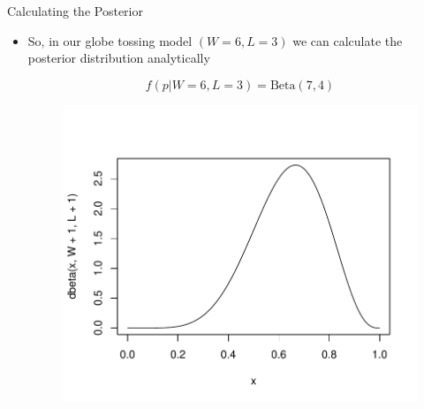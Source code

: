 \documentclass[handout]{beamer}
\begin{document}
\begin{frame}{Calculating the Posterior}
\scriptsize{

\begin{itemize}


\item So, in our globe tossing model $(W=6,L=3)$ we can calculate the posterior distribution analytically 

\begin{displaymath}
f(p|W=6,L=3) =  \text{Beta}(7,4) 
\end{displaymath}


\begin{figure}[h!]
	\centering
	\includegraphics[scale=0.55]{pics/beta(7,4).pdf}
\end{figure}



\end{itemize}

} 

\end{frame}
\end{document}
